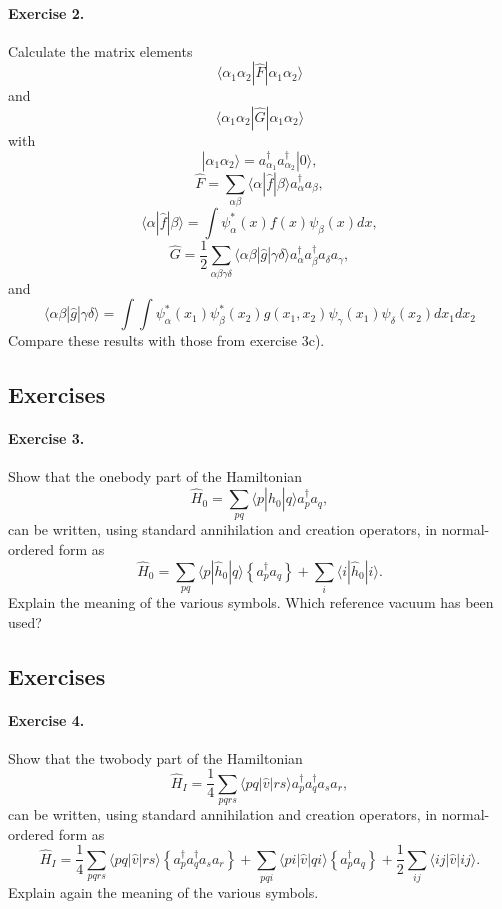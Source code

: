 \documentclass[%
twoside,                 %
final,                   %
10pt]{article}
\begin{document}
\paragraph{Exercise 2.}
Calculate the matrix elements
\[
\langle \alpha_{1}\alpha_{2}|\hat{F}|\alpha_{1}\alpha_{2}\rangle
\]
and
\[
\langle \alpha_{1}\alpha_{2}|\hat{G}|\alpha_{1}\alpha_{2}\rangle
\]
with
\[
|\alpha_{1}\alpha_{2}\rangle=a_{\alpha_{1}}^{\dagger}a_{\alpha_{2}}^{\dagger}|0\rangle ,
\]
\[
\hat{F}=\sum_{\alpha\beta}\langle \alpha|\hat{f}|\beta\rangle
a_{\alpha}^{\dagger}a_{\beta}  ,
\]
\[
\langle \alpha|\hat{f}|\beta\rangle=\int \psi_{\alpha}^{*}(x)f(x)\psi_{\beta}(x)dx ,
\]
\[
\hat{G} = \frac{1}{2}\sum_{\alpha\beta\gamma\delta}
\langle \alpha\beta |\hat{g}|\gamma\delta\rangle
a_{\alpha}^{\dagger}a_{\beta}^{\dagger}a_{\delta}a_{\gamma} ,
\]
and
\[
\langle \alpha\beta |\hat{g}|\gamma\delta\rangle=
\int\int \psi_{\alpha}^{*}(x_{1})\psi_{\beta}^{*}(x_{2})g(x_{1},
x_{2})\psi_{\gamma}(x_{1})\psi_{\delta}(x_{2})dx_{1}dx_{2}
\]
Compare these results with those from exercise 3c).



\subsection*{Exercises}

\paragraph{Exercise 3.}
Show that the onebody part of the Hamiltonian
\[	     
\hat{H}_0 = \sum_{pq} \langle p|\hat{h}_0|q\rangle a^{\dagger}_p a_q,
\]
can be written, using standard annihilation and creation operators, in normal-ordered form as 
\[
\hat{H}_0 = \sum_{pq} \langle p|\hat{h}_0|q\rangle \left\{a^\dagger_p a_q\right\} +
             \sum_i \langle i|\hat{h}_0|i\rangle.
\]
Explain the meaning of the various symbols. Which reference 
vacuum has been used?

  

\subsection*{Exercises}

\paragraph{Exercise 4.}
Show that the twobody part of the Hamiltonian
\[
  \hat{H}_I = \frac{1}{4} \sum_{pqrs} \langle pq|\hat{v}|rs\rangle a^\dagger_p a^\dagger_q a_s  a_r,
\]
can be written, using standard annihilation and creation operators, in normal-ordered form as 
\[
\hat{H}_I =\frac{1}{4} \sum_{pqrs} \langle pq|\hat{v}|rs\rangle \left\{a^\dagger_p a^\dagger_q a_s  a_r\right\}
            + \sum_{pqi} \langle pi|\hat{v}|qi\rangle \left\{a^\dagger_p a_q\right\} 
            + \frac{1}{2} \sum_{ij}\langle ij|\hat{v}|ij\rangle.
\]
Explain again the meaning of the various symbols.
\end{document}
